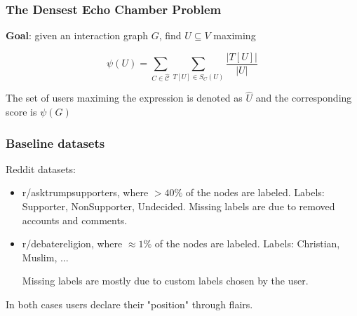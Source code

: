 \documentclass{beamer}
\begin{document}
\begin{frame}[c]
	\frametitle{The Densest Echo Chamber Problem}
	\textbf{Goal}: given an interaction graph $G$, find $U \subseteq V$ maximing

	\begin{equation}
		\psi (U) = \sum^{}_{C \in \hat{\mathcal{C}} } \sum^{}_{T[U] \in S_C (U)}
		\frac{| T[U] |}{|U|}
	\end{equation}

	The set of users maximing the expression is denoted as $\hat{U}$ and the
	corresponding score is $\psi(G)$
\end{frame}

\begin{frame}[c]
	\frametitle{Baseline datasets}
	Reddit datasets:

	\begin{itemize}
		\item r/asktrumpsupporters, where $> 40 \% $ of the nodes are labeled.
		      Labels: Supporter, NonSupporter, Undecided. Missing labels are
		      due to removed accounts and comments.
		\item r/debatereligion, where $\approx 1 \%$ of the nodes are labeled.
		      Labels: Christian, Muslim, ...

		      Missing labels are mostly due to custom labels chosen by the user.
	\end{itemize}

	In both cases users declare their "position" through flairs.
\end{frame}
\end{document}
